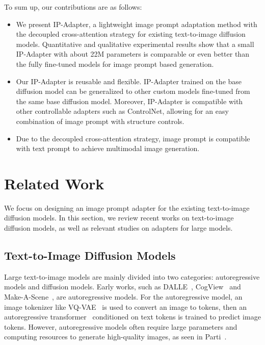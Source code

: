 \documentclass{article}
\begin{document}
To sum up, our contributions are as follows:

\begin{itemize}
    \item We present IP-Adapter, a lightweight image prompt adaptation method with the decoupled cross-attention strategy for existing text-to-image diffusion models. Quantitative and qualitative experimental results show that a small IP-Adapter with about 22M parameters is comparable or even better than the fully fine-tuned models for image prompt based generation.
    \item Our IP-Adapter is reusable and flexible. IP-Adapter trained on the base diffusion model can be generalized to other custom models fine-tuned from the same base diffusion model. Moreover, IP-Adapter is compatible with other controllable adapters such as ControlNet, allowing for an easy combination of image prompt with structure controls.
    \item Due to the decoupled cross-attention strategy, image prompt is compatible with text prompt to achieve multimodal image generation.
\end{itemize}

\section{Related Work}

We focus on designing an image prompt adapter for the existing text-to-image diffusion models. In this section, we review recent works on text-to-image diffusion models, as well as relevant studies on adapters for large models.

\subsection{Text-to-Image Diffusion Models}
Large text-to-image models are mainly divided into two categories: autoregressive models and diffusion models. Early works, such as DALLE~\cite{ramesh2021zero}, CogView~\cite{ding2021cogview,ding2022cogview2} and Make-A-Scene~\cite{gafni2022make}, are autoregressive models. For the autoregressive model, an image tokenizer like VQ-VAE~\cite{van2017neural} is used to convert an image to tokens, then an autoregressive transformer~\cite{vaswani2017attention} conditioned on text tokens is trained to predict image tokens. However, autoregressive models often require large parameters and computing resources to generate high-quality images, as seen in Parti~\cite{yu2022scaling}.
\end{document}

